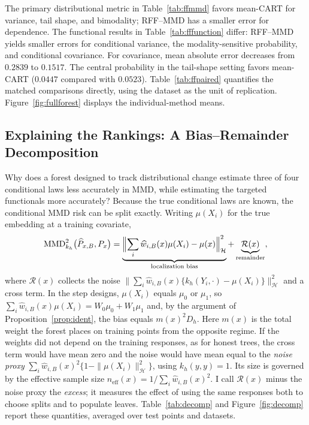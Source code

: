 \documentclass[12pt,a4paper]{article}
\newcommand{\calH}{\mathcal H}
\newcommand{\MMD}{\operatorname{MMD}}
\newcommand{\1}{\mathbf 1}
\begin{document}
The primary distributional metric in Table~\ref{tab:ffmmd} favors mean-CART for variance, tail shape, and bimodality; RFF--MMD has a smaller error for dependence. The functional results in Table~\ref{tab:fffunction} differ: RFF--MMD yields smaller errors for conditional variance, the modality-sensitive probability, and conditional covariance. For covariance, mean absolute error decreases from $0.2839$ to $0.1517$. The central probability in the tail-shape setting favors mean-CART ($0.0447$ compared with $0.0523$). Table~\ref{tab:ffpaired} quantifies the matched comparisons directly, using the dataset as the unit of replication. Figure~\ref{fig:fullforest} displays the individual-method means.

\subsection{Explaining the Rankings: A Bias--Remainder Decomposition}\label{sec:decomposition}
Why does a forest designed to track distributional change estimate three of four conditional laws less accurately in MMD, while estimating the targeted functionals more accurately? Because the true conditional laws are known, the conditional MMD risk can be split exactly. Writing $\mu(X_i)$ for the true embedding at a training covariate,
\begin{equation}\label{eq:decomp}
 \MMD_{k_h}^2\bigl(\widehat P_{x,B},P_x\bigr)
 =\underbrace{\Bigl\|\sum_i\widehat w_{i,B}(x)\mu(X_i)-\mu(x)\Bigr\|_{\calH}^2}_{\text{localization bias}}
 +\underbrace{\mathcal R(x)}_{\text{remainder}},
\end{equation}
where $\mathcal R(x)$ collects the noise $\|\sum_i\widehat w_{i,B}(x)\{k_h(Y_i,\cdot)-\mu(X_i)\}\|_{\calH}^2$ and a cross term. In the step designs, $\mu(X_i)$ equals $\mu_0$ or $\mu_1$, so $\sum_i\widehat w_{i,B}(x)\mu(X_i)=W_0\mu_0+W_1\mu_1$ and, by the argument of Proposition~\ref{prop:ident}, the bias equals $m(x)^2D_h$. Here $m(x)$ is the total weight the forest places on training points from the opposite regime. If the weights did not depend on the training responses, as for honest trees, the cross term would have mean zero and the noise would have mean equal to the \emph{noise proxy} $\sum_i\widehat w_{i,B}(x)^2\{1-\|\mu(X_i)\|_{\calH}^2\}$, using $k_h(y,y)=1$. Its size is governed by the effective sample size $n_{\mathrm{eff}}(x)=1/\sum_i\widehat w_{i,B}(x)^2$. I call $\mathcal R(x)$ minus the noise proxy the \emph{excess}; it measures the effect of using the same responses both to choose splits and to populate leaves. Table~\ref{tab:decomp} and Figure~\ref{fig:decomp} report these quantities, averaged over test points and datasets.
\end{document}
